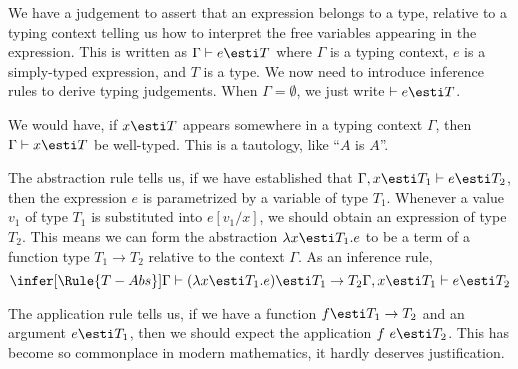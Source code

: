 \begin{node}[Syntax]
\begin{node}\label{stlc-0007}%
We have a judgement to assert that an expression belongs to a type,
relative to a typing context telling us how to interpret the free
variables appearing in the expression. This is written as
$\Gamma\vdash e\esti T$ where $\Gamma$ is a typing context, $e$ is a
simply-typed expression, and $T$ is a type. We now need to introduce
inference rules to derive typing judgements. When $\Gamma=\emptyset$, we
just write $\vdash e\esti T$.

\begin{node}\label{stlc-000A}%
We would have, if $x\esti T$ appears somewhere in a typing context
$\Gamma$, then $\Gamma\vdash x\esti T$ be well-typed. This is a
tautology, like ``$A$ is $A$''.
\end{node}

\begin{node}\label{stlc-000B}%
The abstraction rule tells us, if we have established that
$\Gamma,x\esti T_{1}\vdash e\esti T_{2}$, then the expression $e$ is
parametrized by a variable of type $T_{1}$. Whenever a value $v_{1}$ of type
$T_{1}$ is substituted into $e[v_{1}/x]$, we should obtain an expression
of type $T_{2}$. This means we can form the abstraction $\lambda x\esti T_{1}.e$
to be a term of a function type $T_{1}\to T_{2}$ relative to the context
$\Gamma$. As an inference rule,
\begin{equation}
\infer[\Rule{T-Abs}]{\Gamma\vdash(\lambda x\esti T_{1}.e)\esti T_{1}\to T_{2}}{%
\Gamma,x\esti T_{1}\vdash e\esti T_{2}}
\end{equation}
\end{node}

\begin{node}\label{stlc-000C}%
The application rule tells us, if we have a function $f\esti T_{1}\to T_{2}$
and an argument $e\esti T_{1}$, then we should expect the application
$f~e\esti T_{2}$. This has become so commonplace in modern mathematics,
it hardly deserves justification.
\end{node}


\end{node}
\end{node}
